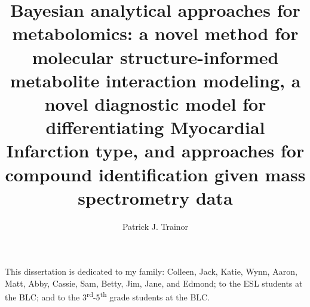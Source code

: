 \documentclass[final]{ulthesis}
\begin{document}
\author{Patrick J. Trainor}


\title{Bayesian analytical approaches for metabolomics: a novel method for molecular structure-informed metabolite interaction modeling, a novel diagnostic model for differentiating Myocardial Infarction type, and  approaches for compound identification given mass spectrometry data}









\frontmatter

\maketitle

\begin{dedication}
This dissertation is dedicated to my family: Colleen, Jack, Katie, Wynn, Aaron, Matt, Abby, Cassie, Sam, Betty, Jim, Jane, and Edmond; to the ESL students at the BLC; and to the 3\textsuperscript{rd}-5\textsuperscript{th} grade students at the BLC.
\end{dedication}
\end{document}
